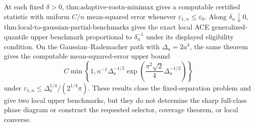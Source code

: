 At each fixed \(\delta>0\), \(\text{thm:adaptive-rootn-minimax}\) gives a computable certified statistic with uniform \(C/n\) mean-squared error whenever \(\varepsilon_{1,n}\le\varepsilon_0\).  Along \(\delta_n\downarrow0\), \(\text{thm:local-to-gaussian-partial-benchmarks}\) gives the exact local ACE generalized-quantile upper benchmark proportional to \(\delta_n^{-1}\) under its displayed eligibility condition.  On the Gaussian--Rademacher path with \(\Delta_a=2a^4\), the same theorem gives the computable mean-squared-error upper bound
\[
 C\min\!\left\{1,n^{-1}\Delta_a^{-1/2}
 \exp\!\left(\frac{\pi^2\sqrt2}{4}\Delta_a^{-1/2}\right)\right\}
\]
under \(\varepsilon_{1,n}\le\Delta_a^{1/4}/(2^{1/4}\pi)\).  These results close the fixed-separation problem and give two local upper benchmarks, but they do not determine the sharp full-class phase diagram or construct the requested selector, coverage theorem, or local converse.